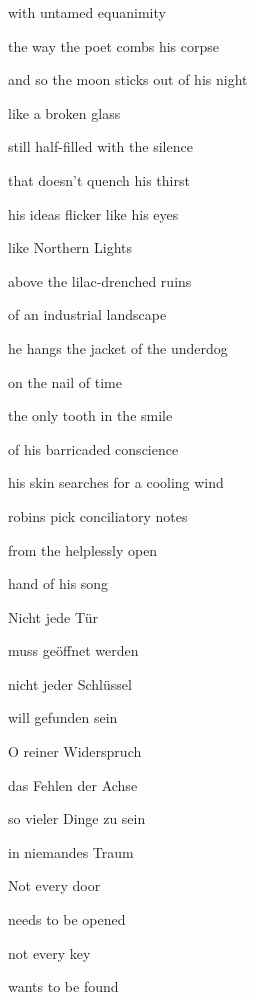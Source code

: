 \documentclass[a4paper]{article}
\begin{document}
with untamed equanimity

the way the poet combs his corpse


\bigskip

and so the moon sticks out of his night

like a broken glass

still half-filled with the silence

that doesn’t quench his thirst


\bigskip

his ideas flicker like his eyes

like Northern Lights

above the lilac-drenched ruins

of an industrial landscape


\bigskip

he hangs the jacket of the underdog

on the nail of time

the only tooth in the smile

of his barricaded conscience


\bigskip

his skin searches for a cooling wind

robins pick conciliatory notes

from the helplessly open

hand of his song


\bigskip



\bigskip

Nicht jede Tür

muss geöffnet werden

nicht jeder Schlüssel

will gefunden sein


\bigskip

O reiner Widerspruch

das Fehlen der Achse 

so vieler Dinge zu sein

in niemandes Traum


\bigskip



\bigskip

Not every door

needs to be opened

not every key

wants to be found


\bigskip
\end{document}
